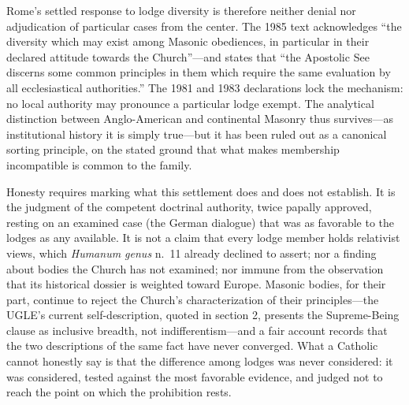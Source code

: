 Rome's settled response to lodge diversity is therefore neither denial nor adjudication of particular cases from the center. The 1985 text acknowledges ``the diversity which may exist among Masonic obediences, in particular in their declared attitude towards the Church''---and states that ``the Apostolic See discerns some common principles in them which require the same evaluation by all ecclesiastical authorities.'' The 1981 and 1983 declarations lock the mechanism: no local authority may pronounce a particular lodge exempt. The analytical distinction between Anglo-American and continental Masonry thus survives---as institutional history it is simply true---but it has been ruled out as a canonical sorting principle, on the stated ground that what makes membership incompatible is common to the family.

Honesty requires marking what this settlement does and does not establish. It is the judgment of the competent doctrinal authority, twice papally approved, resting on an examined case (the German dialogue) that was as favorable to the lodges as any available. It is not a claim that every lodge member holds relativist views, which \emph{Humanum genus} n.~11 already declined to assert; nor a finding about bodies the Church has not examined; nor immune from the observation that its historical dossier is weighted toward Europe. Masonic bodies, for their part, continue to reject the Church's characterization of their principles---the UGLE's current self-description, quoted in section 2, presents the Supreme-Being clause as inclusive breadth, not indifferentism---and a fair account records that the two descriptions of the same fact have never converged. What a Catholic cannot honestly say is that the difference among lodges was never considered: it was considered, tested against the most favorable evidence, and judged not to reach the point on which the prohibition rests.
